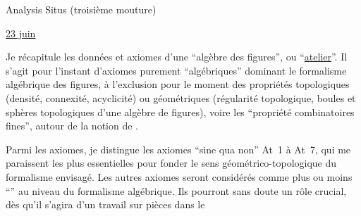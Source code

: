 \begin{center}Analysis Situs (troisième mouture)\end{center}

\uline{23 juin}

Je récapitule les données et axiomes d'une ``algèbre des figures'', ou ``\uline{atelier}''. Il s'agit pour l'instant d'axiomes purement ``algébriques'' dominant le formalisme algébrique des figures, à l'exclusion pour le moment des propriétés topologiques (densité, connexité, acyclicité) ou  géométriques (régularité topologique, boules et sphères topologiques d'une algèbre de figures), voire les ``propriété combinatoires fines'', autour de la notion de .

Parmi les axiomes, je distingue les axiomes ``sine qua non'' At~1 à At~7, qui me paraissent les plus essentielles pour fonder le sens géométrico-topologique du formalisme envisagé. Les autres axiomes seront considérés comme plus ou moins ``'' au niveau du formalisme algébrique. Ils pourront sans doute un rôle crucial, dès qu'il s'agira d'un travail sur pièces dans le
